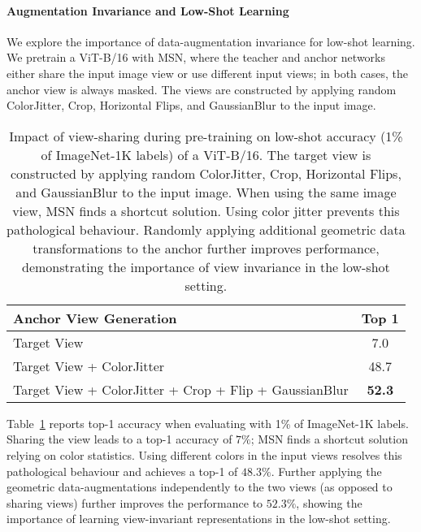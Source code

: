 \documentclass{article}
\begin{document}
\paragraph{Augmentation Invariance and Low-Shot Learning}
We explore the importance of data-augmentation invariance for low-shot learning.
We pretrain a ViT-B/16 with MSN, where the teacher and anchor networks either share the input image view or use different input views; in both cases, the anchor view is always masked.
The views are constructed by applying random ColorJitter, Crop, Horizontal Flips, and GaussianBlur to the input image.
\begin{table}[h]
  \centering
  \caption{Impact of view-sharing during pre-training on low-shot accuracy (1\% of ImageNet-1K labels) of a ViT-B/16. The target view is constructed by applying random ColorJitter, Crop, Horizontal Flips, and GaussianBlur to the input image. When using the same image view, MSN finds a shortcut solution. Using color jitter prevents this pathological behaviour. Randomly applying additional geometric data transformations to the anchor further improves performance, demonstrating the importance of view invariance in the low-shot setting.}
  \label{tb:invariance_aug}
    \begin{tabular}{l | c}
    {\bf\small Anchor View Generation} & {\bf\small Top 1} \\\toprule
    Target View &  7.0 \\
    Target View + ColorJitter & 48.7  \\
    Target View + ColorJitter + Crop + Flip + GaussianBlur  & \cellcolor{fbApp}\bf 52.3 \\
    \bottomrule
    \end{tabular}
\end{table}

Table~\ref{tb:invariance_aug} reports top-1 accuracy when evaluating with 1\% of ImageNet-1K labels. Sharing the view leads to a top-1 accuracy of $7\%$; MSN finds a shortcut solution relying on color statistics. Using different colors in the input views resolves this pathological behaviour and achieves a top-1 of $48.3\%$. Further applying the geometric data-augmentations independently to the two views (as opposed to sharing views) further improves the performance to $52.3\%$, showing the importance of learning view-invariant representations in the low-shot setting.
\end{document}

